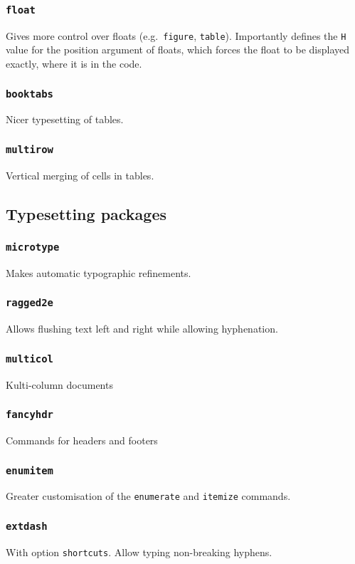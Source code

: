 \documentclass{article}
\begin{document}
\subsubsection{\texttt{float}}
Gives more control over floats (e.g.\ \texttt{figure}, \texttt{table}). Importantly defines the \texttt{H} value for the position argument of floats, which forces the float to be displayed exactly, where it is in the code.
\subsubsection{\texttt{booktabs}}
Nicer typesetting of tables.
\subsubsection{\texttt{multirow}}
Vertical merging of cells in tables.

\subsection{Typesetting packages}
\subsubsection{\texttt{microtype}}
Makes automatic typographic refinements.
\subsubsection{\texttt{ragged2e}}
Allows flushing text left and right while allowing hyphenation.
\subsubsection{\texttt{multicol}}
Kulti-column documents
\subsubsection{\texttt{fancyhdr}}
Commands for headers and footers
\subsubsection{\texttt{enumitem}}
Greater customisation of the \texttt{enumerate} and \texttt{itemize} commands.
\subsubsection{\texttt{extdash}}
With option \texttt{shortcuts}. Allow typing non-breaking hyphens.
\end{document}
